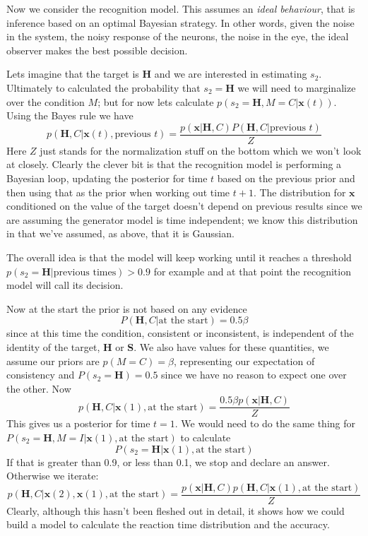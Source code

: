 \documentclass[12pt]{article}
\begin{document}
Now we consider the recognition model. This assumes an \textsl{ideal
  behaviour}, that is inference based on an optimal Bayesian
strategy. In other words, given the noise in the system, the noisy
response of the neurons, the noise in the eye, the ideal observer
makes the best possible decision.

Lets imagine that the target is \textbf{H} and we are interested in
estimating $s_2$. Ultimately to calculated the probability that
$s_2=\mathbf{H}$ we will need to marginalize over the condition $M$;
but for now lets calculate $p(s_2=\mathbf{H},M=C|\textbf{x}(t))$.
Using the Bayes rule we have
\begin{equation}
p(\mathbf{H},C|\textbf{x}(t),\mbox{previous $t$})=\frac{p(\textbf{x}|\mathbf{H},C)P(\mathbf{H},C|\mbox{previous $t$})}{Z}
\end{equation}
Here $Z$ just stands for the normalization stuff on the bottom which
we won't look at closely. Clearly the clever bit is that the
recognition model is performing a Bayesian loop, updating the
posterior for time $t$ based on the previous prior and then using that
as the prior when working out time $t+1$. The distribution for
$\mathbf{x}$ conditioned on the value of the target doesn't depend on
previous results since we are assuming the generator model is time
independent; we know this distribution in that we've assumed, as
above, that it is Gaussian.

The overall idea is that the model will keep working until it reaches
a threshold $p(s_2=\mathbf{H}|\mbox{previous times})>0.9$ for example
and at that point the recognition model will call its decision.

Now at the start the prior is not based on any evidence
\begin{equation}
P(\mathbf{H},C|\mbox{at the start})=0.5\beta
\end{equation}
since at this time the condition, consistent or inconsistent, is
independent of the identity of the target, \textbf{H} or
\textbf{S}. We also have values for these quantities, we assume our
priors are $p(M=C)=\beta$, representing our expectation of consistency
and $P(s_2=\mathbf{H})=0.5$ since we have no reason to expect one over
the other. Now
\begin{equation}
p(\mathbf{H},C|\textbf{x}(1),\mbox{at the start})=\frac{0.5\beta p(\textbf{x}|\mathbf{H},C)}{Z}
\end{equation}
This gives us a posterior for time $t=1$. We would need to do the same
thing for $P(s_2=\mathbf{H},M=I|\textbf{x}(1),\mbox{at the start})$
to calculate 
\begin{equation}
P(s_2=\mathbf{H}|\textbf{x}(1),\mbox{at the
  start})
\end{equation}
If that is greater than 0.9, or less than 0.1, we stop and
declare an answer. Otherwise we iterate:
\begin{equation}
p(\mathbf{H},C|\textbf{x}(2),\textbf{x}(1),\mbox{at the start})=\frac{p(\textbf{x}|\mathbf{H},C)p(\mathbf{H},C|\textbf{x}(1),\mbox{at the start})}{Z}
\end{equation}
Clearly, although this hasn't been fleshed out in detail, it shows how
we could build a model to calculate the reaction time distribution and
the accuracy.
\end{document}
